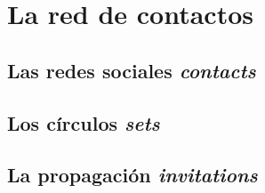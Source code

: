 \chapter{La red de contactos}

\section{Las redes sociales \emph{contacts}}
\section{Los círculos \emph{sets}}
\section{La propagación \emph{invitations}}
